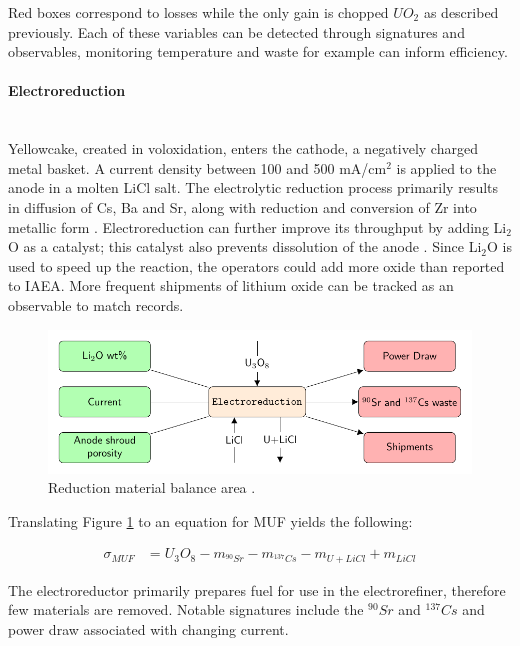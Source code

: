 Red boxes correspond to losses while the only gain is chopped $UO_2$ as described previously. Each of these variables can be detected through signatures and observables, monitoring temperature and waste for example can inform efficiency.

\paragraph{Electroreduction} \mbox{}\\ 
Yellowcake, created in voloxidation, enters the cathode, a negatively charged metal basket. 
A current density between 100 and 500 mA/cm$^2$ is applied to the anode in a molten LiCl salt. 
The electrolytic reduction process primarily results in diffusion of Cs, Ba and Sr, along with reduction and conversion of Zr into metallic form \cite{choi_electrochemical_2015,flowsheet_1998}.
Electroreduction can further improve its throughput by adding Li$_2$O as a catalyst; this catalyst also prevents dissolution 
of the anode \cite{choi_electrochemical_2015}. Since Li$_2$O is used to speed up the reaction,
the operators could add more oxide than reported to \gls{IAEA}. More frequent shipments 
of lithium oxide can be tracked as an observable to match records.

\begin{figure}[h]
	\centering
	\includegraphics[width=0.9\linewidth]{images/reduction}
	\caption{Reduction material balance area \cite{lee_advanced_2008}.}
	\label{fig:reduction}
\end{figure}

Translating Figure \ref{fig:reduction} to an equation for MUF yields the following:

\begin{align}
\sigma_{MUF} &= U_3O_8 - m_{^{90}Sr} - m_{^{137}Cs} - m_{U+LiCl} + m_{LiCl}
\end{align}

The electroreductor primarily prepares fuel for use in the electrorefiner, therefore few materials are removed. Notable signatures include the $^{90}Sr$ and $^{137}Cs$ and power draw associated with changing current.

